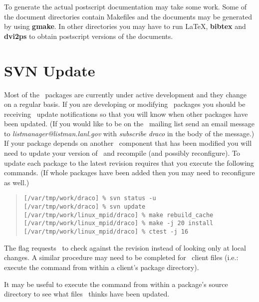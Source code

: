 To generate the actual postscript documentation may take some work.
Some of the document directories contain Makefiles and the documents
may be generated by using \textbf{gmake}.  In other directories you
may have to run \LaTeX, \textbf{bibtex} and \textbf{dvi2ps} to obtain
postscript versions of the documents.

\section{SVN Update}

Most of the \draco\ packages are currently under active development
and they change on a regular basis.  If you are developing or
modifying \draco\ packages you should be receiving \svn\ update
notifications so that you will know when other packages have been
updated.  (If you would like to be on the \draco\ mailing list send an
email message to \emph{listmanager@listman.lanl.gov} with
\emph{subscribe draco} in the body of the message.)  If your package
depends on another \draco\ component that has been modified you will
need to update your version of \draco\ and recompile (and possibly
reconfigure).  To update each package to the latest revision requires
that you execute the following commands.  (If whole packages have been
added then you may need to reconfigure as well.)

\footnotesize
\begin{verse}
\texttt{[/var/tmp/work/draco] \% svn status -u} \\
\texttt{[/var/tmp/work/draco] \% svn update} \\
\texttt{[/var/tmp/work/linux\_mpid/draco] \% make rebuild\_cache} \\
\texttt{[/var/tmp/work/linux\_mpid/draco] \% make -j 20 install} \\
\texttt{[/var/tmp/work/linux\_mpid/draco] \% ctest -j 16}
\end{verse}
\normalsize

The  flag requests \svn\ to check against the 
revision instead of looking only at local changes. A similar procedure
may need to be completed for \draco\ client files (i.e.: execute the
 command from within a client's package directory).

It may be useful to execute the command  from
within a package's source directory to see what files \svn\ thinks
have been updated.  

